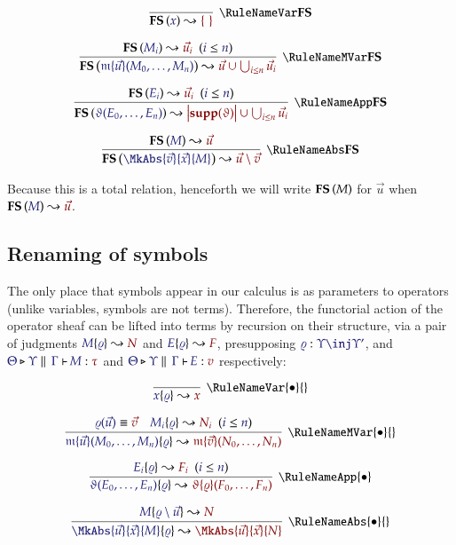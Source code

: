 \begin{gather*}
  \infer[\RuleFSVar]{
    \CalcFS{x}{\MkSet{}}
  }{
  }\\[6pt]
  \infer[\RuleFSMVar]{
    \CalcFS{
      \MApp{\MV{m}}{\vec{u}}{M_0,\dots,M_n}
    }{
      \vec{u} \cup \bigcup_{i\leq n} \vec{u}_i
    }
  }{
    \HypJ{
      \CalcFS{M_i}{\vec{u}_i}
    }{
      \Leq{i}{n}
    }
  }\\[6pt]
  \infer[\RuleFSApp]{
    \CalcFS{
      \App{\vartheta}{E_0,\dots,E_n}
    }{
      \Dom{\Supp{\vartheta}} \cup \bigcup_{i\leq n} \vec{u}_i
    }
  }{
    \HypJ{
      \CalcFS{E_i}{\vec{u}_i}
    }{
      \Leq{i}{n}
    }
  }\\[6pt]
  \infer[\RuleFSAbs]{
    \CalcFS{
      \MkAbs{\vec{v}}{\vec{x}}{M}
    }{
      \vec{u}\setminus\vec{v}
    }
  }{
    \CalcFS{M}{\vec{u}}
  }
\end{gather*}

Because this is a total relation, henceforth we will write $\mathbf{FS}\left(M\right)$ for
$\vec{u}$ when $\CalcFS{M}{\vec{u}}$.


\subsection{Renaming of symbols}

\newcommand\RuleRenPrefix{\bullet}
\newcommand\RuleRenVar{\RuleNameVar{\RuleRenPrefix}{}}
\newcommand\RuleRenMVar{\RuleNameMVar{\RuleRenPrefix}{}}
\newcommand\RuleRenApp{\RuleNameApp{\RuleRenPrefix}}
\newcommand\RuleRenAbs{\RuleNameAbs{\RuleRenPrefix}{}}

The only place that symbols appear in our calculus is as parameters to operators
(unlike variables, symbols are not terms). Therefore, the functorial action of
the operator sheaf can be lifted into terms by recursion on their
structure, via a pair of judgments $\IsRenaming{\varrho}{M}{N}$ and
$\IsRenaming{\varrho}{E}{F}$, presupposing $\Of{\varrho}{\Upsilon\inj\Upsilon'}$,
and $\IsAbt{\Theta}{\Upsilon}{\Gamma}{M}{\tau}$ and
$\IsAbt{\Theta}{\Upsilon}{\Gamma}{E}{v}$ respectively:

\begin{gather*}
  \infer[\RuleRenVar]{
    \IsRenaming{\varrho}{x}{x}
  }{
  }
\\[6pt]
  \infer[\RuleRenMVar]{
    \IsRenaming{\varrho}{
      \MApp{\MV{m}}{\vec{u}}{M_0,\dots,M_n}
    }{
      \MApp{\MV{m}}{\vec{v}}{N_0,\dots,N_n}
    }
  }{
    \Match{\varrho(\vec{u})}{\vec{v}}
&
    \HypJ{
      \IsRenaming{\varrho}{M_i}{N_i}
    }{
      \Leq{i}{n}
    }
  }
\\[6pt]
  \infer[\RuleRenApp]{
    \IsRenaming{\varrho}{
      \App{\vartheta}{E_0,\dots,E_n}
    }{
      \App{\Rename{\varrho}{\vartheta}}{F_0,\dots,F_n}
    }
  }{
    \HypJ{
      \IsRenaming{\varrho}{E_i}{F_i}
    }{
      \Leq{i}{n}
    }
  }
\\[6pt]
  \infer[\RuleRenAbs]{
    \IsRenaming{\varrho}{
      \MkAbs{\vec{u}}{\vec{x}}{M}
    }{
      \MkAbs{\vec{u}}{\vec{x}}{N}
    }
  }{
    \IsRenaming{\varrho\setminus\vec{u}}{M}{N}
  }
\end{gather*}

